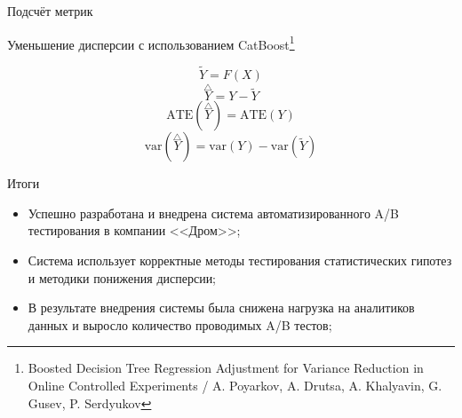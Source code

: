 \documentclass[12pt, unicode]{beamer}
\newif\ifmetropolis
\begin{document}

	\begin{frame}[fragile]{Подсчёт метрик}
		\begin{block}{Уменьшение дисперсии с использованием CatBoost\footnote[3]{
					Boosted Decision Tree Regression Adjustment for Variance Reduction in Online
Controlled Experiments / A. Poyarkov, A. Drutsa, A. Khalyavin, G. Gusev, P.
Serdyukov
			}}
			\ifmetropolis
			\smallskip
			\fi
			\begin{equation}
				\tilde{Y}=F(X)
			\end{equation}
			\begin{equation}
				\overset{\triangle}{Y}=Y-\tilde{Y}
			\end{equation}
			\begin{equation}
				\text{ATE}(\overset{\triangle}{Y})=\text{ATE}(Y)
			\end{equation}
			\begin{equation}
				\text{var}(\overset{\triangle}{Y})=\text{var}(Y)-\text{var}(\tilde{Y})
			\end{equation}
		\end{block}
		\vfill\null
	\end{frame}
	

	\begin{frame}[fragile]{Итоги}
		\begin{block}{}
			\begin{itemize}
				\item Успешно разработана и внедрена система автоматизированного A/B тестирования в компании <<Дром>>;
				\item Система использует корректные методы тестирования статистических гипотез и методики понижения дисперсии;
				\item В результате внедрения системы была снижена нагрузка на аналитиков данных и выросло количество проводимых A/B тестов;
			\end{itemize}
		\end{block}
	\end{frame}

    
\end{document}
